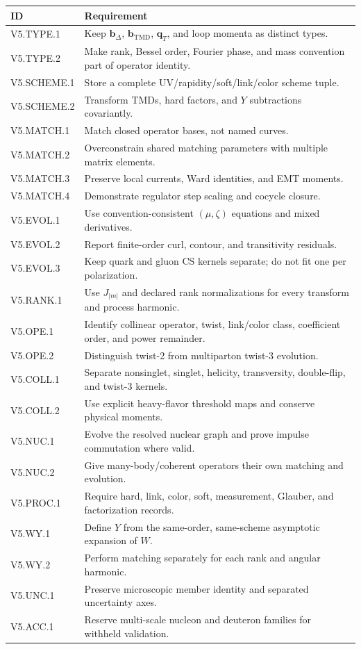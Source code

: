 \documentclass[11pt]{article}
\newcommand{\qT}{\bm{q}_{T}}
\newcommand{\bD}{\bm{b}_{\Delta}}
\newcommand{\bM}{\bm{b}_{\mathrm{TMD}}}
\begin{document}
\begin{longtable}{L{0.16\textwidth}L{0.76\textwidth}}
\toprule
ID & Requirement\\
\midrule
\endhead
V5.TYPE.1 & Keep \(\bD\), \(\bM\), \(\qT\), and loop momenta as distinct types.\\
V5.TYPE.2 & Make rank, Bessel order, Fourier phase, and mass convention part of operator identity.\\
V5.SCHEME.1 & Store a complete UV/rapidity/soft/link/color scheme tuple.\\
V5.SCHEME.2 & Transform TMDs, hard factors, and \(Y\) subtractions covariantly.\\
V5.MATCH.1 & Match closed operator bases, not named curves.\\
V5.MATCH.2 & Overconstrain shared matching parameters with multiple matrix elements.\\
V5.MATCH.3 & Preserve local currents, Ward identities, and EMT moments.\\
V5.MATCH.4 & Demonstrate regulator step scaling and cocycle closure.\\
V5.EVOL.1 & Use convention-consistent \((\mu,\zeta)\) equations and mixed derivatives.\\
V5.EVOL.2 & Report finite-order curl, contour, and transitivity residuals.\\
V5.EVOL.3 & Keep quark and gluon CS kernels separate; do not fit one per polarization.\\
V5.RANK.1 & Use \(J_{|m|}\) and declared rank normalizations for every transform and process harmonic.\\
V5.OPE.1 & Identify collinear operator, twist, link/color class, coefficient order, and power remainder.\\
V5.OPE.2 & Distinguish twist-2 from multiparton twist-3 evolution.\\
V5.COLL.1 & Separate nonsinglet, singlet, helicity, transversity, double-flip, and twist-3 kernels.\\
V5.COLL.2 & Use explicit heavy-flavor threshold maps and conserve physical moments.\\
V5.NUC.1 & Evolve the resolved nuclear graph and prove impulse commutation where valid.\\
V5.NUC.2 & Give many-body/coherent operators their own matching and evolution.\\
V5.PROC.1 & Require hard, link, color, soft, measurement, Glauber, and factorization records.\\
V5.WY.1 & Define \(Y\) from the same-order, same-scheme asymptotic expansion of \(W\).\\
V5.WY.2 & Perform matching separately for each rank and angular harmonic.\\
V5.UNC.1 & Preserve microscopic member identity and separated uncertainty axes.\\
V5.ACC.1 & Reserve multi-scale nucleon and deuteron families for withheld validation.\\
\bottomrule
\end{longtable}
\end{document}
